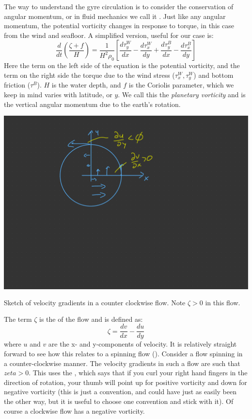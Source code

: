The way to understand the gyre circulation is to consider the conservation of angular momentum, or in fluid mechanics we call it .  Just like any angular momentum, the potential vorticity changes in response to torque, in this case from the wind and seafloor.  A simplified version, useful for our case is:
\begin{equation}
    \frac{d}{dt}\left(\frac{\zeta + f}{H} \right) = \frac{1}{H^2\rho_0} \left[\frac{d\tau_y^W}{dx} - \frac{d\tau_x^W}{dy} + \frac{d\tau_y^B}{dx} - \frac{d\tau_x^B}{dy}\right]
\end{equation}
Here the term on the left side of the equation is the potential vorticity, and the term on the right side the torque due to the wind stress ($\tau_x^W, \tau_y^W$) and bottom friction ($\tau^B$).  $H$ is the water depth, and $f$ is the Coriolis parameter, which we keep in mind varies with latitude, or $y$.  We call this the \emph{planetary vorticity} and is the vertical angular momentum due to the earth's rotation.  
\begin{marginfigure}
    \includegraphics{figs/Sverdrup/relativevortsketch}
    \caption{Sketch of velocity gradients in a counter clockwise flow.  Note $\zeta>0$ in this flow.}
    \label{fig:relativevortsketch}  
\end{marginfigure}
The term $\zeta$ is the  of the flow and is defined as:
\begin{equation}
    \zeta = \frac{dv}{dx} - \frac{du}{dy}
\end{equation}
where $u$ and $v$ are the x- and y-components of velocity.  It is relatively straight forward to see how this relates to a spinning flow ().  Consider a flow spinning in a counter-clockwise manner.  The velocity gradients in such a flow are such that $zeta > 0$.  This uses the , which says that if you curl your right hand fingers in the direction of rotation, your thumb will point up for positive vorticity and down for negative vorticity (this is just a convention, and could have just as easily been the other way, but it is useful to choose one convention and stick with it).  Of course a clockwise flow has a negative vorticity.  

